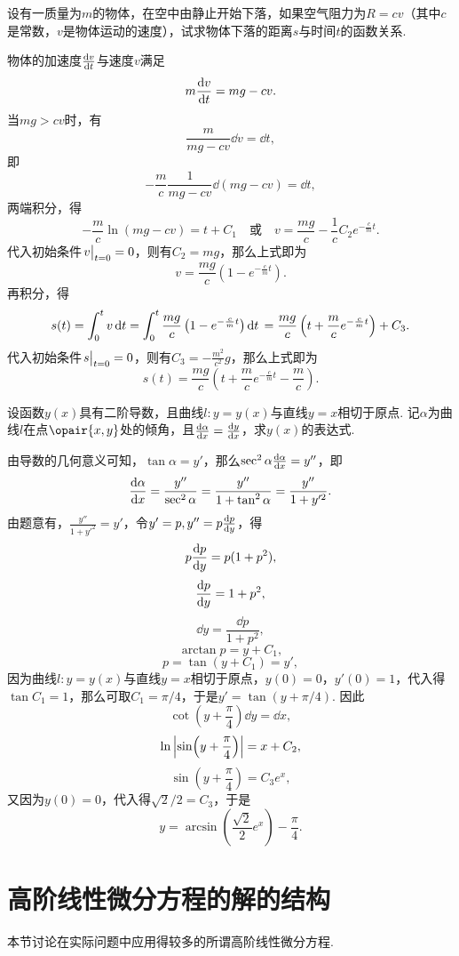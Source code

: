 \begin{example}
设有一质量为\(m\)的物体，在空中由静止开始下落，如果空气阻力为\(R = cv\)（其中\(c\)是常数，\(v\)是物体运动的速度），试求物体下落的距离\(s\)与时间\(t\)的函数关系.
\begin{solution}
物体的加速度\(\dv{v}{t}\)与速度\(v\)满足\[
m \dv{v}{t} = mg - cv.
\]当\(mg>cv\)时，有\[
\frac{m}{mg-cv} \dd{v} = \dd{t},
\]即\[
-\frac{m}{c} \frac{1}{mg-cv} \dd(mg-cv) = \dd{t},
\]两端积分，得\[
-\frac{m}{c} \ln(mg-cv) = t + C_1
\quad\text{或}\quad
v = \frac{mg}{c} - \frac{1}{c} C_2 e^{-\frac{c}{m} t}.
\]代入初始条件\(\eval{v}_{t=0} = 0\)，则有\(C_2 = mg\)，那么上式即为\[
v = \frac{mg}{c} \left( 1 - e^{-\frac{c}{m} t} \right).
\]再积分，得\[
s(t) = \int_0^t v \dd{t}
= \int_0^t \frac{mg}{c} \left( 1 - e^{-\frac{c}{m} t} \right) \dd{t} \\
= \frac{mg}{c} \left( t + \frac{m}{c} e^{-\frac{c}{m} t} \right) + C_3.
\]
代入初始条件\(\eval{s}_{t=0} = 0\)，则有\(C_3 = -\frac{m^2}{c^2} g\)，那么上式即为\[
s(t) = \frac{mg}{c} \left( t + \frac{m}{c} e^{-\frac{c}{m} t} - \frac{m}{c} \right).
\]
\end{solution}
\end{example}

\begin{example}
设函数\(y(x)\)具有二阶导数，且曲线\(l: y=y(x)\)与直线\(y=x\)相切于原点.
记\(\alpha\)为曲线\(l\)在点\(\opair{x,y}\)处的倾角，且\(\dv{\alpha}{x}=\dv{y}{x}\)，求\(y(x)\)的表达式.
\begin{solution}
由导数的几何意义可知，\(\tan\alpha=y'\)，那么\(\sec^2\alpha \dv{\alpha}{x} = y''\)，即\[
\dv{\alpha}{x} = \frac{y''}{\sec^2\alpha}
= \frac{y''}{1+\tan^2\alpha}
= \frac{y''}{1+y'^2}.
\]由题意有，\(\frac{y''}{1+y'^2} = y'\)，令\(y' = p, y'' = p\dv{p}{y}\)，得\[
p\dv{p}{y} = p(1+p^2),
\]\[
\dv{p}{y} = 1+p^2,
\]\[
\dd{y} = \frac{\dd{p}}{1+p^2},
\]\[
\arctan p = y + C_1,
\]\[
p = \tan(y+C_1) = y',
\]因为曲线\(l: y=y(x)\)与直线\(y=x\)相切于原点，\(y(0) = 0\)，\(y'(0) = 1\)，代入得\(\tan C_1 = 1\)，那么可取\(C_1 = \pi/4\)，于是\(y' = \tan(y+\pi/4)\).%
因此\[
\cot(y+\frac{\pi}{4}) \dd{y} = \dd{x},
\]\[
\ln\abs{\sin(y+\frac{\pi}{4})} = x + C_2,
\]\[
\sin(y+\frac{\pi}{4}) = C_3 e^x,
\]又因为\(y(0) = 0\)，代入得\(\sqrt{2}/2 = C_3\)，于是\[
y = \arcsin(\frac{\sqrt{2}}{2} e^x) - \frac{\pi}{4}.
\]
\end{solution}
\end{example}

\section{高阶线性微分方程的解的结构}
本节讨论在实际问题中应用得较多的所谓高阶线性微分方程.

